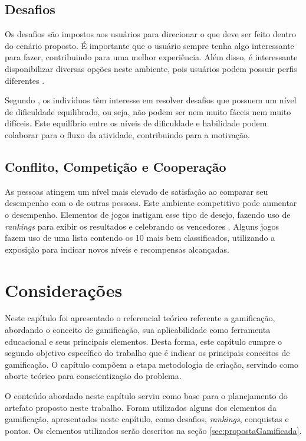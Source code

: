 \documentclass[
	12pt,				%
	oneside,			%
	a4paper,			%
	english,			%
	french,				%
	spanish,			%
	brazil,				%
	]{abntex2}
\begin{document}
\subsection{Desafios}                

Os desafios são impostos aos usuários para direcionar o que deve ser feito dentro do cenário proposto. É importante que o usuário sempre tenha algo interessante para fazer, contribuindo para uma melhor experiência. Além disso, é interessante disponibilizar diversas opções neste ambiente, pois usuários podem possuir perfis diferentes \cite{fardo2013gamificaccao}.

Segundo \citet{busarello2016gamificaccao}, os indivíduos têm interesse em resolver desafios que possuem um nível de dificuldade equilibrado, ou seja, não podem ser nem muito fáceis nem muito difíceis. Este equilíbrio entre os níveis de dificuldade e habilidade podem colaborar para o fluxo da atividade, contribuindo para a motivação.
    
\subsection{Conflito, Competição e Cooperação}                    

As pessoas atingem um nível mais elevado de satisfação ao comparar seu desempenho com o de outras pessoas. Este ambiente competitivo pode aumentar o desempenho. Elementos de jogos instigam esse tipo de desejo, fazendo uso de \textit{rankings} para exibir os resultados e celebrando os vencedores  \cite{bunchball2016gamification}. Alguns jogos fazem uso de uma lista contendo os 10 mais bem classificados, utilizando a exposição para indicar novos níveis e recompensas alcançadas.

\section{Considerações}

Neste capítulo foi apresentado o referencial teórico referente a gamificação, abordando o conceito de gamificação, sua aplicabilidade como ferramenta educacional e seus principais elementos. Desta forma, este capítulo cumpre o segundo objetivo específico do trabalho que é indicar os principais conceitos de gamificação. O capítulo compõem a etapa metodologia de criação, servindo como aborte teórico para conscientização do problema.

O conteúdo abordado neste capítulo serviu como base para o planejamento do artefato proposto neste trabalho. Foram utilizados alguns dos elementos da gamificação, apresentados neste capítulo, como desafios, \textit{rankings}, conquistas e pontos. Os elementos utilizados serão descritos na seção \ref{sec:propostaGamificada}.
\end{document}
